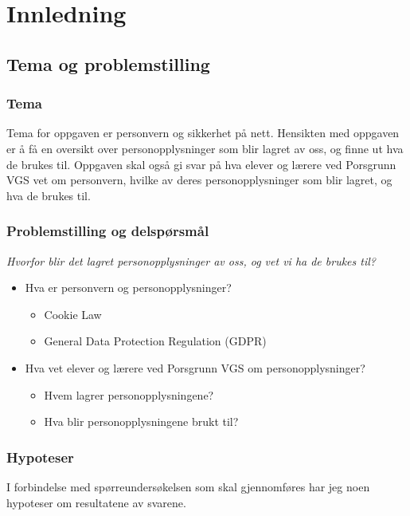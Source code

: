\section{Innledning}

\subsection{Tema og problemstilling}\label{subsec:problemstilling}

\subsubsection{Tema}
Tema for oppgaven er personvern og sikkerhet på nett. Hensikten med oppgaven er å få en oversikt over personopplysninger som blir lagret av oss, og finne ut hva de brukes til. Oppgaven skal også gi svar på hva elever og lærere ved Porsgrunn VGS vet om personvern, hvilke av deres personopplysninger som blir lagret, og hva de brukes til.

\subsubsection{Problemstilling og delspørsmål}\label{subsubsec:problemstilling}
\textit{Hvorfor blir det lagret personopplysninger av oss, og vet vi ha de brukes til?}

\begin{itemize}
    \item Hva er personvern og personopplysninger?
    \begin{itemize}
        \item Cookie Law
        \item General Data Protection Regulation (GDPR)
    \end{itemize}
    \item Hva vet elever og lærere ved Porsgrunn VGS om personopplysninger?
    \begin{itemize}
        \item Hvem lagrer personopplysningene?
        \item Hva blir personopplysningene brukt til?
    \end{itemize}
\end{itemize}

\subsubsection{Hypoteser}\label{subsubsec:hypoteser}
I forbindelse med spørreundersøkelsen som skal gjennomføres har jeg noen hypoteser om resultatene av svarene. 

